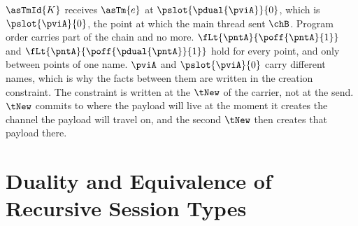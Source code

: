 $\asTmId{K}$ receives $\asTm{e}$ at $\pslot{\pdual{\pviA}}{0}$, which is
$\pslot{\pviA}{0}$, the point at which the main thread sent $\chB$.
Program order carries part of the chain and no more.
$\fLt{\pntA}{\poff{\pntA}{1}}$ and $\fLt{\pntA}{\poff{\pdual{\pntA}}{1}}$
hold for every point, and only between points of one name. $\pviA$ and
$\pslot{\pviA}{0}$ carry different names, which is why the facts between
them are written in the creation constraint. The constraint is written
at the $\tNew$ of the carrier, not at the send. $\tNew$ commits to where
the payload will live at the moment it creates the channel the payload
will travel on, and the second $\tNew$ then creates that payload there.

\section{Duality and Equivalence of Recursive Session Types}
\label{sec:app-duality}

